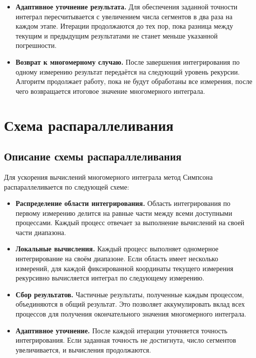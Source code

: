 \documentclass[12pt]{article}
\begin{document}
\begin{itemize}
    \item \textbf{Адаптивное уточнение результата.}
          Для обеспечения заданной точности интеграл пересчитывается с увеличением числа сегментов в два раза на каждом этапе. Итерации продолжаются до тех пор, пока разница между текущим и предыдущим результатами не станет меньше указанной погрешности.

    \item \textbf{Возврат к многомерному случаю.}
          После завершения интегрирования по одному измерению результат передаётся на следующий уровень рекурсии. Алгоритм продолжает работу, пока не будут обработаны все измерения, после чего возвращается итоговое значение многомерного интеграла.
\end{itemize}

\section*{Схема распараллеливания}

\subsection*{Описание схемы распараллеливания}
Для ускорения вычислений многомерного интеграла метод Симпсона распараллеливается по следующей схеме:
\begin{itemize}
    \item \textbf{Распределение области интегрирования.}
          Область интегрирования по первому измерению делится на равные части между всеми доступными процессами. Каждый процесс отвечает за выполнение вычислений на своей части диапазона.

    \item \textbf{Локальные вычисления.}
          Каждый процесс выполняет одномерное интегрирование на своём диапазоне. Если область имеет несколько измерений, для каждой фиксированной координаты текущего измерения рекурсивно вычисляется интеграл по следующему измерению.

    \item \textbf{Сбор результатов.}
          Частичные результаты, полученные каждым процессом, объединяются в общий результат. Это позволяет аккумулировать вклад всех процессов для получения окончательного значения многомерного интеграла.

    \item \textbf{Адаптивное уточнение.}
          После каждой итерации уточняется точность интегрирования. Если заданная точность не достигнута, число сегментов увеличивается, и вычисления продолжаются.
\end{itemize}
\end{document}
